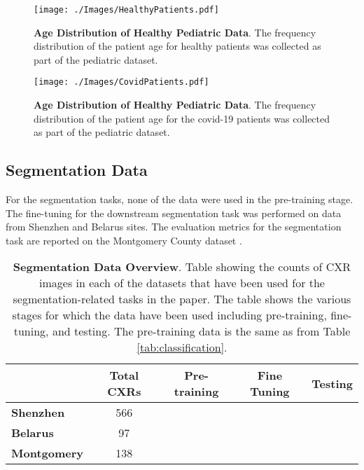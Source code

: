 \documentclass[10pt,journal,compsoc]{IEEEtran}
\newcommand{\cmark}{\ding{51}}\newcommand{\xmark}{\ding{55}}
\begin{document}
\begin{figure*}[ht]
\begin{center}  
\texttt{[image: ./Images/HealthyPatients.pdf]}
\end{center}
\caption{\textbf{Age Distribution of Healthy Pediatric Data}. The frequency distribution of the patient age for healthy patients was collected as part of the pediatric dataset.}
\label{fig:healthydata}
\end{figure*}

\begin{figure*}[ht]
\begin{center}  
\texttt{[image: ./Images/CovidPatients.pdf]}
\end{center}
\caption{\textbf{Age Distribution of Healthy Pediatric Data}. The frequency distribution of the patient age for the covid-19 patients was collected as part of the pediatric dataset.}
\label{fig:coviddata}
\end{figure*}
\clearpage
\subsection{Segmentation Data}\label{section:dataset-seg}

For the segmentation tasks, none of the data were used in the pre-training stage. The fine-tuning for the downstream segmentation task was performed on data from Shenzhen \cite{jaeger2013automatic} and Belarus sites. The evaluation metrics for the segmentation task are reported on the Montgomery County dataset \cite{candemir2013lung}. 


\begin{table}[ht]
 \caption{\textbf{Segmentation Data Overview}. Table showing the counts of CXR images in each of the datasets that have been used for the segmentation-related tasks in the paper. The table shows the various stages for which the data have been used including pre-training, fine-tuning, and testing. The pre-training data is the same as from Table \ref{tab:classification}.}
\label{tab:segmentation}
\begin{center}
\begin{tabular}{|l|c|c|c|c|}
\hline
& \textbf{Total CXRs} & \textbf{Pre-training} & \textbf{Fine Tuning} & \textbf{Testing} \\ \hline \hline
\textbf{Shenzhen}    & 566            & \xmark                   & \cmark                 & \xmark               \\
\textbf{Belarus}     & 97             & \xmark                   & \cmark                & \xmark    \\ \hline

\textbf{Montgomery} & 138            & \xmark                   & \xmark                  & \cmark             \\ \hline  


\end{tabular}
\end{center}
\end{table}
\end{document}
